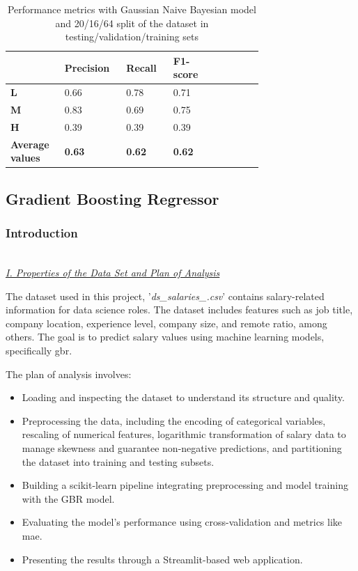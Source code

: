 \documentclass[11pt,a4paper]{article}
\newcommand{\subsubsubsection}[1]{
  {\setlength\itemindent{13pt} \textit{\uline{\\#1\\}}} 
}
\begin{document}
\begin{table}
\centering
\begin{tabular}{p{0.12\linewidth}|p{0.15\linewidth}|p{0.15\linewidth}|p{0.15\linewidth}|p{0.15\linewidth}} \hline
&\textbf{Precision}&\textbf{Recall}&\textbf{F1-score}\\ \hline
\textbf{L}&0.66&0.78&0.71\\ \hline
\textbf{M}&0.83&0.69&0.75\\ \hline
\textbf{H}&0.39&0.39&0.39\\ \hline
\textbf{Average values}&\textbf{0.63}&\textbf{0.62}&\textbf{0.62}\\ \hline
\end{tabular}
\caption{Performance metrics with Gaussian Naive Bayesian model and 20/16/64 split of the dataset in testing/validation/training sets}
\label{tab:Performance metrics with Gaussian Naive Bayesian model and 20/16/64 split }
\end{table}


\subsection{Gradient Boosting Regressor}
\subsubsection{Introduction}
\subsubsubsection{I. Properties of the Data Set and Plan of Analysis}
The dataset used in this project, '\textit{ds\_salaries_\regression.csv}' \cite{Kaggle} contains salary-related information for data science roles. The dataset includes features such as job title, company location, experience level, company size, and remote ratio, among others. The goal is to predict salary values using machine learning models, specifically \acrfull{gbr}.

The plan of analysis involves:

\begin{itemize}
\item Loading and inspecting the dataset to understand its structure and quality.
\item Preprocessing the data, including the encoding of categorical variables, rescaling of numerical features, logarithmic transformation of salary data to manage skewness and guarantee non-negative predictions, and partitioning the dataset into training and testing subsets.
\item Building a scikit-learn pipeline integrating preprocessing and model training with the GBR model.
\item Evaluating the model's performance using cross-validation and metrics like  \acrshort{mae}.
\item Presenting the results through a Streamlit-based web application.
\end{itemize}
\end{document}
